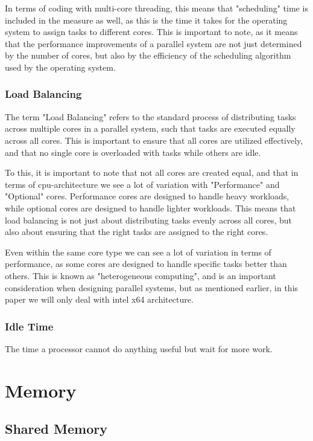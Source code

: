 \documentclass{article}
\begin{document}
In terms of coding with multi-core threading, this means that "scheduling" time is included in the measure as well, as this is the time it takes for the operating system to assign tasks to different cores. This is important to note, as it means that the performance improvements of a parallel system are not just determined by the number of cores, but also by the efficiency of the scheduling algorithm used by the operating system.

\subsubsection{Load Balancing}

The term "Load Balancing" refers to the standard process of distributing tasks across multiple cores in a parallel system, such that tasks are executed equally across all cores. This is important to ensure that all cores are utilized effectively, and that no single core is overloaded with tasks while others are idle.

To this, it is important to note that not all cores are created equal, and that in terms of cpu-architecture we see a lot of variation with "Performance" and "Optional" cores. Performance cores are designed to handle heavy workloads, while optional cores are designed to handle lighter workloads. This means that load balancing is not just about distributing tasks evenly across all cores, but also about ensuring that the right tasks are assigned to the right cores. 

Even within the same core type we can see a lot of variation in terms of performance, as some cores are designed to handle specific tasks better than others. This is known as "heterogeneous computing", and is an important consideration when designing parallel systems, but as mentioned earlier, in this paper we will only deal with intel x64 architecture.

\subsubsection{Idle Time}

The time a processor cannot do anything useful but wait for more work.

\section{Memory}
\subsection{Shared Memory}
\end{document}
